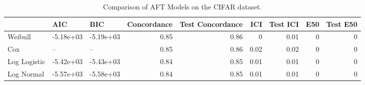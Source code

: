 \begin{table*}
\centering
\caption{Comparison of AFT Models on the CIFAR dataset.}
\label{tab:cifar}
\begin{tabular}{lllrrrrrr}
\toprule
 & AIC & BIC & Concordance & Test Concordance & ICI & Test ICI & E50 & Test E50 \\
\midrule
Weibull & -5.18e+03 & -5.19e+03 & 0.85 & 0.86 & 0 & 0.01 & 0 & 0 \\
Cox & -- & -- & 0.85 & 0.86 & 0.02 & 0.02 & 0 & 0 \\
Log Logistic & -5.42e+03 & -5.43e+03 & 0.84 & 0.85 & 0.01 & 0.01 & 0 & 0 \\
Log Normal & -5.57e+03 & -5.58e+03 & 0.84 & 0.85 & 0.01 & 0.01 & 0 & 0 \\
\bottomrule
\end{tabular}
\end{table*}
